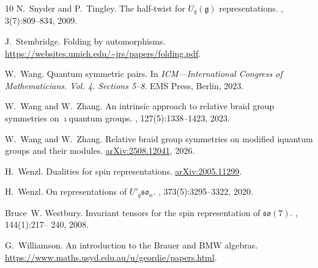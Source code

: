 \documentclass[10pt]{amsart}
\numberwithin{equation}{section}
\newcommand{\arxiv}[1]{\href{https://arxiv.org/abs/#1}{\small  arXiv:#1}}
\theoremstyle{definition}
\begin{document}
\begin{thebibliography}{10}
N.~Snyder and P.~Tingley.
\newblock The half-twist for ${U}_q(\mathfrak{g})$ representations.
, 3(7):809--834, 2009.

J.~Stembridge.
\newblock Folding by automorphisms.
\newblock \url{https://websites.umich.edu/~jrs/papers/folding.pdf}.

W.~Wang.
\newblock Quantum symmetric pairs.
\newblock In {\em I{CM}---{I}nternational {C}ongress of {M}athematicians.
  {V}ol. 4. {S}ections 5--8}. EMS Press, Berlin, 2023.

W.~Wang and W.~Zhang.
\newblock An intrinsic approach to relative braid group symmetries on
  {$\imath$}quantum groups.
, 127(5):1338--1423, 2023.

W.~Wang and W.~Zhang.
\newblock Relative braid group symmetries on modified iquantum groups and their
  modules.
\newblock \arxiv{2508.12041}, 2026.

H.~Wenzl.
\newblock Dualities for spin representations.
\newblock \arxiv{2005.11299}.

H.~Wenzl.
\newblock On representations of {$U'_q\mathfrak{so}_n$}.
, 373(5):3295--3322, 2020.

Bruce~W. Westbury.
\newblock Invariant tensors for the spin representation of $\mathfrak{so}(7)$.
, 144(1):217-- 240, 2008.

G.~Williamson.
\newblock An introduction to the {B}rauer and {BMW} algebras.
\newblock \url{https://www.maths.usyd.edu.au/u/geordie/papers.html}.

\end{thebibliography}
\end{document}
